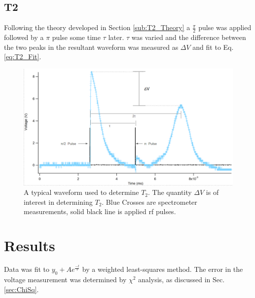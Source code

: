 \documentclass[11pt,letterpaper]{article}
\begin{document}
\subsection{T2}
Following the theory developed in Section \ref{sub:T2_Theory} a $\frac{\pi}{2}$ pulse was applied followed by a $\pi$ pulse some time $\tau$ later. $\tau$ was varied and the difference between the two peaks in the resultant waveform was measured as $\Delta V$ and fit to Eq. \ref{eq:T2_Fit}.

\begin{figure}[h!]
  \centering
      \includegraphics[scale=.3]{Typical_T2_Annotated.png}
      \caption{A typical waveform used to determine $T_2$. The quantity $\Delta V$ is of interest in determining $T_2$. Blue Crosses are spectrometer measurements, solid black line is applied rf pulses.}
      \label{fig:Typical_T2}
\end{figure}
\FloatBarrier


\section{Results}
Data was fit to $y_0+Ae^{\frac{-t}{\tau}}$ by a weighted least-squares method. The error in the voltage measurement was determined by $\chi^2$ analysis, as discussed in Sec. \ref{sec:ChiSq}.
\end{document}
